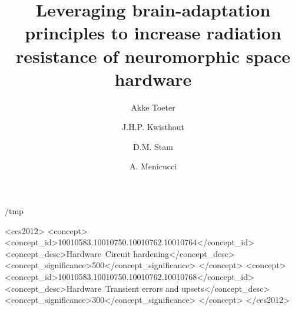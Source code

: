 \documentclass[sigconf]{acmart}
\def\overleafhome{/tmp}%
\begin{document}
\title{Leveraging brain-adaptation principles to increase radiation resistance of neuromorphic space hardware}

\author{Akke Toeter}


\author{J.H.P. Kwisthout}

\author{D.M. Stam}

\author{A. Menicucci}

\renewcommand{\shortauthors}{Toeter, et al.}

\ifx\homepath\overleafhome
  
\else
  
\fi


\begin{CCSXML}
  <ccs2012>
    <concept>
        <concept_id>10010583.10010750.10010762.10010764</concept_id>
        <concept_desc>Hardware~Circuit hardening</concept_desc>
        <concept_significance>500</concept_significance>
        </concept>
    <concept>
        <concept_id>10010583.10010750.10010762.10010768</concept_id>
        <concept_desc>Hardware~Transient errors and upsets</concept_desc>
        <concept_significance>300</concept_significance>
        </concept>
  </ccs2012>
\end{CCSXML}
\end{document}
